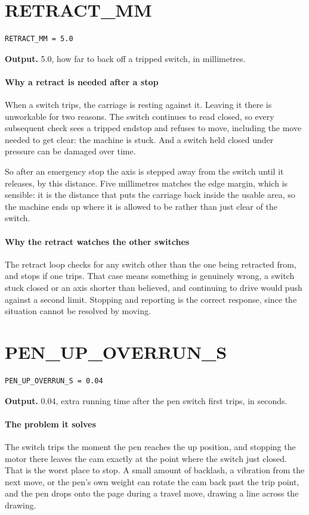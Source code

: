 \section{RETRACT\_MM}
\begin{lstlisting}[style=sig]
RETRACT_MM = 5.0
\end{lstlisting}

\noindent\textbf{Output.} 5.0, how far to back off a tripped switch, in millimetres.


\paragraph{Why a retract is needed after a stop}
When a switch trips, the carriage is resting against it. Leaving it there is unworkable for two reasons. The switch continues to read closed, so every subsequent check sees a tripped endstop and refuses to move, including the move needed to get clear: the machine is stuck. And a switch held closed under pressure can be damaged over time.

So after an emergency stop the axis is stepped away from the switch until it releases, by this distance. Five millimetres matches the edge margin, which is sensible: it is the distance that puts the carriage back inside the usable area, so the machine ends up where it is allowed to be rather than just clear of the switch.


\paragraph{Why the retract watches the other switches}
The retract loop checks for any switch other than the one being retracted from, and stops if one trips. That case means something is genuinely wrong, a switch stuck closed or an axis shorter than believed, and continuing to drive would push against a second limit. Stopping and reporting is the correct response, since the situation cannot be resolved by moving.


\section{PEN\_UP\_OVERRUN\_S}
\begin{lstlisting}[style=sig]
PEN_UP_OVERRUN_S = 0.04
\end{lstlisting}

\noindent\textbf{Output.} 0.04, extra running time after the pen switch first trips, in seconds.


\paragraph{The problem it solves}
The switch trips the moment the pen reaches the up position, and stopping the motor there leaves the cam exactly at the point where the switch just closed. That is the worst place to stop. A small amount of backlash, a vibration from the next move, or the pen's own weight can rotate the cam back past the trip point, and the pen drops onto the page during a travel move, drawing a line across the drawing.

